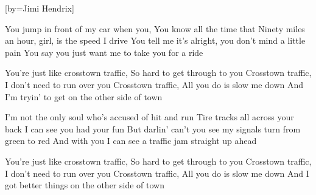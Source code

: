 

[by=Jimi Hendrix]

\begin{LARGE}


\beginverse
You jump in front of my car when you,
You know all the time that
Ninety miles an hour, girl, is the speed I drive
You tell me it's alright, you don't mind a little pain
You say you just want me to take you for a ride
\endverse

\beginchorus
You're just like crosstown traffic, So hard to get through to you
Crosstown traffic, I don't need to run over you
Crosstown traffic, All you do is slow me down
And I'm tryin' to get on the other side of town
\endchorus

\beginverse
I'm not the only soul who's accused of hit and run
Tire tracks all across your back
I can see you had your fun
But darlin' can't you see my signals turn from green to red
And with you I can see a traffic jam straight up ahead
\endverse

\beginchorus
You're just like crosstown traffic, So hard to get through to you
Crosstown traffic, I don't need to run over you
Crosstown traffic, All you do is slow me down
And I got better things on the other side of town
\endchorus


\end{LARGE}


\chordson
\endsong
